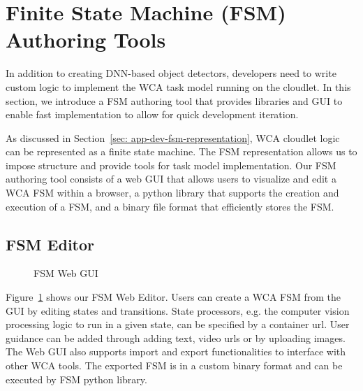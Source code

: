 \section{Finite State Machine (FSM) Authoring Tools}
\label{sec: app-dev-fsm}

In addition to creating DNN-based object detectors, developers need to write
custom logic to implement the WCA task model running on the cloudlet. In this
section, we introduce a FSM authoring tool that provides libraries and GUI to
enable fast implementation to allow for quick development iteration.

As discussed in Section~\ref{sec: app-dev-fsm-representation}, WCA cloudlet
logic can be represented as a finite state machine. The FSM representation
allows us to impose structure and provide tools for task model implementation.
Our FSM authoring tool consists of a web GUI that allows users to visualize and
edit a WCA FSM within a browser, a python library that supports the creation and
execution of a FSM, and a binary file format that efficiently stores the FSM.

\subsection{FSM Editor}

\begin{figure}
    \centering
	\caption{FSM Web GUI}
    \label{figs:fsm-web-gui}
\end{figure}

Figure~\ref{figs:fsm-web-gui} shows our FSM Web Editor. Users can create a WCA
FSM from the GUI by editing states and transitions. State processors, e.g. the
computer vision processing logic to run in a given state, can be specified by a
container url. User guidance can be added through adding text, video urls or by
uploading images. The Web GUI also supports import and export functionalities to
interface with other WCA tools. The exported FSM is in a custom binary format
and can be executed by FSM python library.

